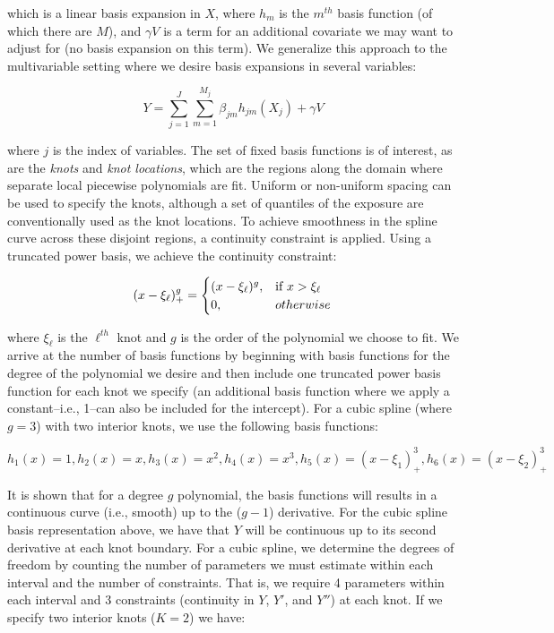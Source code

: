 \documentclass{article}
\begin{document}
\noindent which is a linear basis expansion in $X$, where $h_m$ is the $m^{th}$ basis function (of which there are $M$), and $\gamma V$ is a term for an additional covariate we may want to adjust for (no basis expansion on this term).\supercite{hastie_elements_2009} We generalize this approach to the multivariable setting where we desire basis expansions in several variables:

$$Y=\sum_{j=1}^{J}\sum_{m=1}^{M_j}{\beta_{jm}{h_{jm}}(X_j)+\gamma V}$$

\noindent where $j$ is the index of variables. The set of fixed basis functions is of interest, as are the \textit{knots} and \textit{knot locations}, which are the regions along the domain where separate local piecewise polynomials are fit. Uniform or non-uniform spacing can be used to specify the knots, although a set of quantiles of the exposure are conventionally used as the knot locations. \supercite{james_introduction_2013} To achieve smoothness in the spline curve across these disjoint regions, a continuity constraint is applied. Using a truncated power basis, we achieve the continuity constraint:

\begin{equation}
(x-\xi_\ell)^{g}_{+}=\begin{cases}
(x-\xi_\ell)^{g}, & \text{if  } x > \xi_\ell \\
0, & otherwise  \notag \\
\end{cases}
\end{equation}

\noindent where $\xi_{\ell}$ is the $\ell^{th}$ knot and $g$ is the order of the polynomial we choose to fit. We arrive at the number of basis functions by beginning with basis functions for the degree of the polynomial we desire and then include one truncated power basis function for each knot we specify (an additional basis function where we apply a constant--i.e., 1--can also be included for the intercept).\supercite{james_introduction_2013} For a cubic spline (where $g=3$) with two interior knots, we use the following basis functions:

$$h_1(x)=1,h_2(x)=x, h_3(x)=x^2, h_4(x)=x^3,h_5(x)=(x-\xi_1)^{3}_{+},h_6(x)=(x-\xi_2)^{3}_{+}$$

\noindent It is shown that for a degree $g$ polynomial, the basis functions will results in a continuous curve (i.e., smooth) up to the ($g-1$) derivative. \supercite{james_introduction_2013} For the cubic spline basis representation above, we have that $Y$ will be continuous up to its second derivative at each knot boundary. For a cubic spline, we determine the degrees of freedom by counting the number of parameters we must estimate within each interval and the number of constraints. That is, we require 4 parameters within each interval and 3 constraints (continuity in $Y$, $Y'$, and $Y''$) at each knot. If we specify two interior knots ($K=2$) we have:
\end{document}

